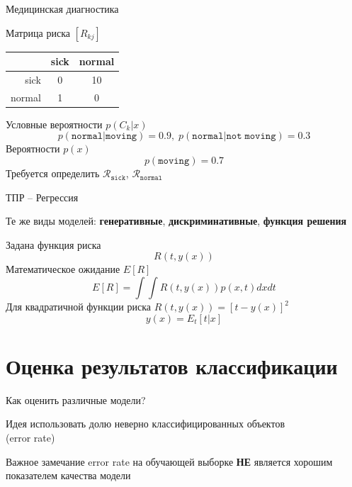 \documentclass[10pt]{beamer}
\begin{document}
\begin{frame}{Медицинская диагностика}

Матрица риска $[R_{kj}]$

\begin{center}
\begin{tabular}{r | c c}
 & sick & normal \\
\hline
sick & 0 & 10 \\
normal & 1 & 0 
\end{tabular}
\end{center}

Условные вероятности $p(C_k | x)$
\[ 
p(\mathtt{normal} | \mathtt{moving}) = 0.9, \; p(\mathtt{normal} | {\mathtt{not\;moving}}) = 0.3
\]
Вероятности $p(x)$
\[
p(\mathtt{moving}) = 0.7
\]
Требуется определить $\mathcal{R}_{\mathtt{sick}}$, $\mathcal{R}_{\mathtt{normal}}$

\end{frame}

\begin{frame}{ТПР -- Регрессия}

Те же виды моделей: {\bf генеративные}, {\bf дискриминативные}, {\bf функция решения}
\vspace{1em}

Задана функция риска
\[
R(t, y(x))
\]
Математическое ожидание $E[R]$
\[
E[R] = \int \!\! \int R(t, y(x)) p(x, t) dx dt 
\]
Для квадратичной функции риска $R(t, y(x)) = [t - y(x)]^2$
\[
y(x) = E_t[t | x]
\]

\end{frame}

\section{Оценка результатов классификации}

\begin{frame}{Как оценить различные модели?}

\begin{block}{Идея}
использовать долю неверно классифицированных объектов \\ (error rate)
\end{block}

\begin{alertblock}{Важное замечание}
error rate на обучающей выборке {\bf НЕ} является хорошим показателем качества модели
\end{alertblock}

\end{frame}
\end{document}
